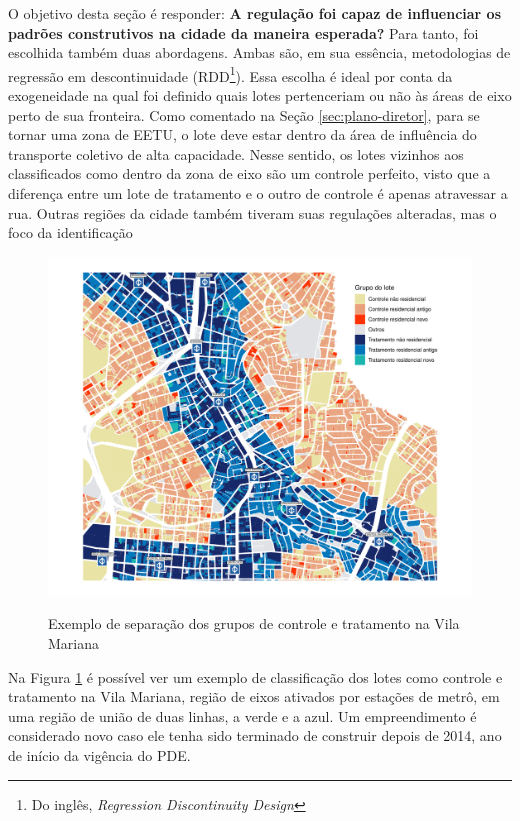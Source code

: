 O objetivo desta seção é responder: \textbf{A regulação foi capaz de influenciar os padrões construtivos na cidade da maneira esperada?} Para tanto, foi escolhida também duas abordagens. Ambas são, em sua essência, metodologias de regressão em descontinuidade (RDD\footnote{Do inglês, \textit{Regression Discontinuity Design}}). Essa escolha é ideal por conta da exogeneidade na qual foi definido quais lotes pertenceriam ou não às áreas de eixo perto de sua fronteira. Como comentado na Seção \ref{sec:plano-diretor}, para se tornar uma zona de EETU, o lote deve estar dentro da área de influência do transporte coletivo de alta capacidade. Nesse sentido, os lotes vizinhos aos classificados como dentro da zona de eixo são um controle perfeito, visto que a diferença entre um lote de tratamento e o outro de controle é apenas atravessar a rua. Outras regiões da cidade também tiveram suas regulações alteradas, mas o foco da identificação 

\begin{figure}[h]
    \centering
    \caption{Exemplo de separação dos grupos de controle e tratamento na Vila Mariana}
    \includegraphics[width = .9\textwidth]{figuras/mapa-lotes-metro.pdf}
    \label{fig:mapaRDD}
\end{figure}

Na Figura \ref{fig:mapaRDD} é possível ver um exemplo de classificação dos lotes como controle e tratamento na Vila Mariana, região de eixos ativados por estações de metrô, em uma região de união de duas linhas, a verde e a azul. Um empreendimento é considerado novo caso ele tenha sido terminado de construir depois de 2014, ano de início da vigência do PDE. 

